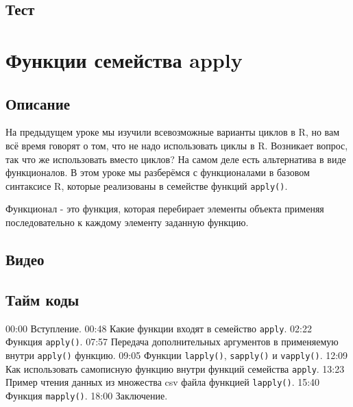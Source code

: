 \documentclass[
]{book}
\begin{document}
\hypertarget{ux442ux435ux441ux442-1}{%
\section{Тест}\label{ux442ux435ux441ux442-1}}

\hypertarget{ux444ux443ux43dux43aux446ux438ux438-ux441ux435ux43cux435ux439ux441ux442ux432ux430-apply}{%
\chapter{Функции семейства apply}\label{ux444ux443ux43dux43aux446ux438ux438-ux441ux435ux43cux435ux439ux441ux442ux432ux430-apply}}

\hypertarget{ux43eux43fux438ux441ux430ux43dux438ux435-2}{%
\section{Описание}\label{ux43eux43fux438ux441ux430ux43dux438ux435-2}}

На предыдущем уроке мы изучили всевозможные варианты циклов в R, но вам всё время говорят о том, что не надо использовать циклы в R. Возникает вопрос, так что же использовать вместо циклов? На самом деле есть альтернатива в виде функционалов. В этом уроке мы разберёмся с функционалами в базовом синтаксисе R, которые реализованы в семействе функций \texttt{apply()}.

Функционал - это функция, которая перебирает элементы объекта применяя последовательно к каждому элементу заданную функцию.

\hypertarget{ux432ux438ux434ux435ux43e-2}{%
\section{Видео}\label{ux432ux438ux434ux435ux43e-2}}

\hypertarget{ux442ux430ux439ux43c-ux43aux43eux434ux44b-2}{%
\section{Тайм коды}\label{ux442ux430ux439ux43c-ux43aux43eux434ux44b-2}}

00:00 Вступление.
00:48 Какие функции входят в семейство \texttt{apply}.
02:22 Функция \texttt{apply()}.
07:57 Передача дополнительных аргументов в применяемую внутри \texttt{apply()} функцию.
09:05 Функции \texttt{lapply()}, \texttt{sapply()} и \texttt{vapply()}.
12:09 Как использовать самописную функцию внутри функций семейства \texttt{apply}.
13:23 Пример чтения данных из множества csv файла функцией \texttt{lapply()}.
15:40 Функция \texttt{mapply()}.
18:00 Заключение.
\end{document}
